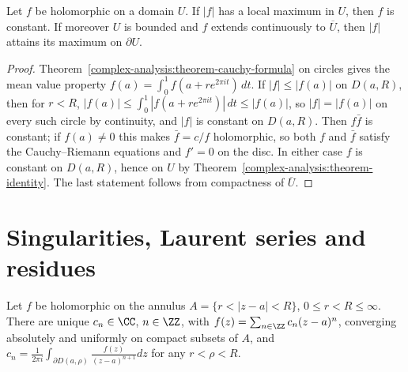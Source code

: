 \begin{theorem}\label{complex-analysis:theorem-maximum-modulus}
Let $f$ be holomorphic on a domain $U$. If $|f|$ has a local maximum in $U$, then $f$ is constant. If moreover $U$ is bounded and $f$ extends continuously to $\overline{U}$, then $|f|$ attains its maximum on
$\partial U$.
\end{theorem}

\begin{proof}
Theorem~\ref{complex-analysis:theorem-cauchy-formula} on circles gives the mean value property $f(a) = \int_0^1f(a + re^{2\pi it})\,dt$. If $|f| \leq |f(a)|$ on $D(a, R)$, then for $r < R$,
$|f(a)| \leq \int_0^1|f(a + re^{2\pi it})|\,dt \leq |f(a)|$, so $|f| = |f(a)|$ on every such circle by continuity, and $|f|$ is constant on $D(a, R)$. Then $f\bar f$ is constant; if $f(a) \neq 0$ this makes
$\bar f = c/f$ holomorphic, so both $f$ and $\bar f$ satisfy the Cauchy--Riemann equations and $f' = 0$ on the disc. In either case $f$ is constant on $D(a, R)$, hence on $U$ by
Theorem~\ref{complex-analysis:theorem-identity}. The last statement follows from compactness of $\overline{U}$.
\end{proof}

\section{Singularities, Laurent series and residues}\label{complex-analysis:section-residues}

\begin{theorem}\label{complex-analysis:theorem-laurent}
Let $f$ be holomorphic on the annulus $A = \{r < |z - a| < R\}$, $0 \leq r < R \leq \infty$. There are unique $c_n \in \CC$, $n \in \ZZ$, with $f(z) = \sum_{n \in \ZZ}c_n(z - a)^n$, converging absolutely and
uniformly on compact subsets of $A$, and $c_n = \frac{1}{2\pi i}\int_{\partial D(a, \rho)}\frac{f(z)}{(z - a)^{n+1}}dz$ for any $r < \rho < R$.
\end{theorem}

